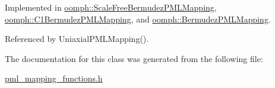 Implemented in \hyperlink{classoomph_1_1ScaleFreeBermudezPMLMapping_a65112b463d5b7d5728fb5325ea09791a}{oomph\+::\+Scale\+Free\+Bermudez\+P\+M\+L\+Mapping}, \hyperlink{classoomph_1_1C1BermudezPMLMapping_a98426cf080db910b65f103696455d8b1}{oomph\+::\+C1\+Bermudez\+P\+M\+L\+Mapping}, and \hyperlink{classoomph_1_1BermudezPMLMapping_a668c619f65e0570fdf97e0e24026593e}{oomph\+::\+Bermudez\+P\+M\+L\+Mapping}.



Referenced by Uniaxial\+P\+M\+L\+Mapping().



The documentation for this class was generated from the following file\+:\begin{DoxyCompactItemize}
\item 
\hyperlink{pml__mapping__functions_8h}{pml\+\_\+mapping\+\_\+functions.\+h}\end{DoxyCompactItemize}
